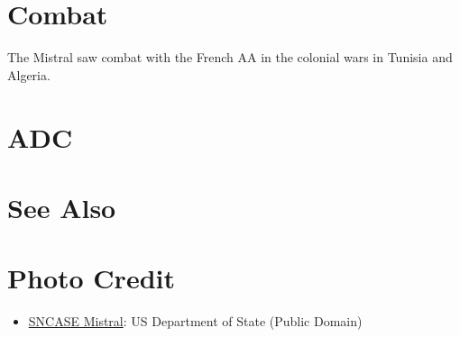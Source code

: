 \section{Combat}

The Mistral saw combat with the French AA in the colonial wars in Tunisia and Algeria.

\section{ADC}
\begin{adclist}
\end{adclist}

\section{See Also}
\begin{typelist}
\end{typelist}

\section{Photo Credit}
\begin{itemize}\raggedright
    \item \href{https://commons.wikimedia.org/wiki/File:SNCASE_Aircraft_Factory_(Armagnac,_Vampire,_Grognarde,_Helicopters,_Mistral)_-_DPLA_-_708581d237cff2cf8e5ad1384b9181d6.jpg}{SNCASE Mistral}: US Department of State (Public Domain)
\end{itemize}
